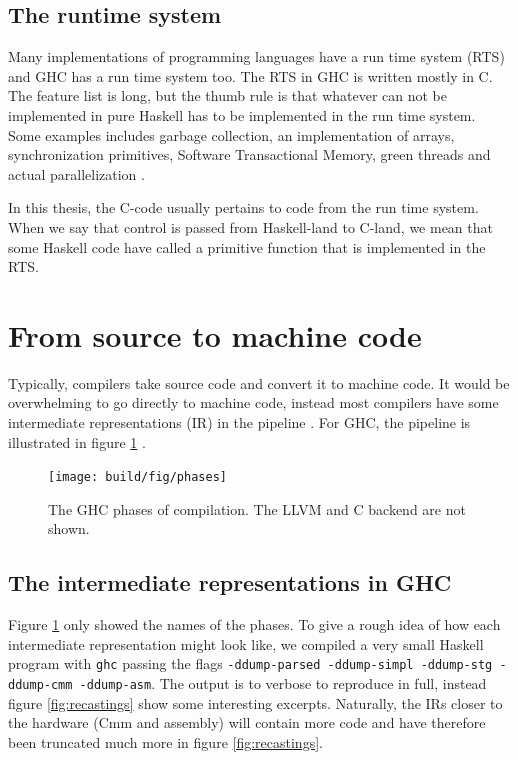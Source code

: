 \subsection{The runtime system}

Many implementations of programming languages have a run time system
(RTS) and GHC has a run time system too. The RTS in GHC is written
mostly in C. The feature list is long, but the thumb rule is that
whatever can not be implemented in pure Haskell has to be implemented
in the run time system. Some examples includes garbage collection,
an implementation of arrays, synchronization primitives, Software
Transactional Memory, green threads and actual parallelization
\cite{commentary_rts}.

In this thesis, the C-code usually pertains to code from the run time
system. When we say that control is passed from Haskell-land to C-land,
we mean that some Haskell code have called a primitive function that is
implemented in the RTS.

\section{From source to machine code}

Typically, compilers take source code and convert it to machine code.
It would be overwhelming to go directly to machine code, instead most
compilers have some intermediate representations (IR) in the pipeline \cite[p.358]{aho2007compilers}.  For GHC, the pipeline is illustrated in
figure \ref{fig:ghc_phases} \cite{terei2009low}.

\begin{figure}
\begin{mdframed}
  \centering
  \texttt{[image: build/fig/phases]}
  \caption{The GHC phases of compilation. The LLVM and C backend are not
shown.}\label{fig:ghc_phases}
\end{mdframed}
\end{figure}

\subsection{The intermediate representations in GHC}

Figure \ref{fig:ghc_phases} only showed the names of the phases. To
give a rough idea of how each intermediate representation might look
like, we compiled a very small Haskell program with \texttt{ghc} passing
the flags \texttt{-ddump-parsed -ddump-simpl -ddump-stg
-ddump-cmm -ddump-asm}. The output is to verbose to reproduce in
full, instead figure \ref{fig:recastings} show some interesting excerpts. Naturally, the
IRs closer to the hardware (Cmm and assembly) will contain more
code and have therefore been truncated much more in figure
\ref{fig:recastings}.

